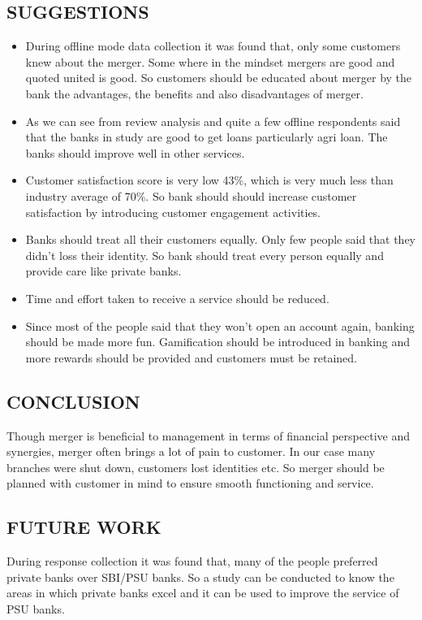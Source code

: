 \documentclass[a4paper, 12pt]{extarticle}
\begin{document}
{\subsection{SUGGESTIONS}
\begin{itemize}
\item During offline mode data collection it was found that, only some customers knew about the merger. Some where in the mindset mergers are good and quoted united is good. So customers should be educated about merger by the bank the advantages, the benefits and also disadvantages of merger.
\item As we can see from review analysis and quite a few offline respondents said that the banks in study are good to get loans particularly agri loan. The banks should improve well in other services.
\item Customer satisfaction score is very low 43\%, which is very much less than industry average of 70\%. So bank should should increase customer satisfaction by introducing customer engagement activities.
\item Banks should treat all their customers equally. Only few people said that they didn't loss their identity. So bank should treat every person equally and provide care like private banks.
\item Time and effort taken to receive a service should be reduced.
\item Since most of the people said that they won't open an account again, banking should be made more fun. Gamification should be introduced in banking and more rewards should be provided and customers must be retained.
\end{itemize}
\subsection{CONCLUSION}
Though merger is beneficial to management in terms of financial perspective and synergies, merger often brings a lot of pain to customer. In our case many branches were shut down, customers lost identities etc. So merger should be planned with customer in mind to ensure smooth functioning and service.

\subsection{FUTURE WORK}
During response collection it was found that, many of the people preferred private banks over SBI/PSU banks. So a study can be conducted to know the areas in which private banks excel and it can be used to improve the service of PSU banks.

}
\end{document}
